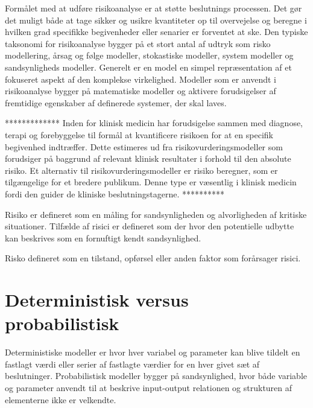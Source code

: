 Formålet med at udføre risikoanalyse er at støtte beslutnings processen. Det gør det muligt både at tage sikker og usikre kvantiteter op til overvejelse og beregne i hvilken grad specifikke begivenheder eller senarier er forventet at ske. Den typiske taksonomi for risikoanalyse bygger på et stort antal af udtryk som risko modellering, årsag og følge modeller, stokastiske modeller, system modeller og sandsynligheds modeller. Generelt er en model en simpel repræsentation af et fokuseret aspekt af den komplekse virkelighed. Modeller som er anvendt i risikoanalyse bygger på matematiske modeller og aktivere forudsigelser af fremtidige egenskaber af definerede systemer, der skal laves. ~\citep{Alam2016}


*************
Inden for klinisk medicin har forudsigelse sammen med diagnose, terapi og forebyggelse til formål at kvantificere risikoen for at en specifik begivenhed indtræffer. Dette estimeres ud fra risikovurderingsmodeller som forudsiger på baggrund af relevant klinisk resultater i forhold til den absolute risiko. Et alternativ til risikovurderingsmodeller er risiko beregner, som er tilgængelige for et bredere publikum. Denne type er væsentlig i klinisk medicin fordi den guider de kliniske beslutningstagerne. 
**********


Risiko er defineret som en måling for sandsynligheden og alvorligheden af kritiske situationer. Tilfælde af risici er defineret som der hvor den potentielle udbytte kan beskrives som en fornuftigt kendt sandsynlighed. 

Risko defineret som en tilstand, opførsel eller anden faktor som forårsager risici.




\section{Deterministisk versus probabilistisk}
Deterministiske modeller er hvor hver variabel og parameter kan blive tildelt en fastlagt værdi eller serier af fastlagte værdier for en hver givet sæt af beslutninger. 
Probabilistisk modeller bygger på sandsynlighed, hvor både variable og parameter anvendt til at beskrive input-output relationen og strukturen af elementerne ikke er velkendte. 





